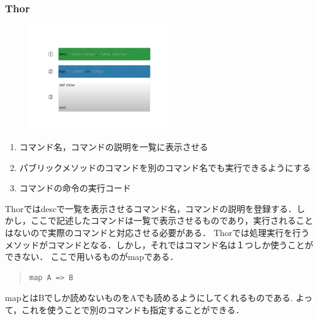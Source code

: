 \subsubsection{Thor}
\begin{figure}[htbp]\begin{center}
\includegraphics[width=6cm,bb=0 0 442 500]{../figs/./hikiutils_yamane_09_copy.004.jpg}
\caption{}
\label{default}\end{center}\end{figure}\begin{enumerate}
\item コマンド名，コマンドの説明を一覧に表示させる
\item パブリックメソッドのコマンドを別のコマンド名でも実行できるようにする
\item コマンドの命令の実行コード
\end{enumerate}
Thorではdescで一覧を表示させるコマンド名，コマンドの説明を登録する．しかし，ここで記述したコマンドは一覧で表示させるものであり，実行されることはないので実際のコマンドと対応させる必要がある．
Thorでは処理実行を行うメソッドがコマンドとなる．しかし，それではコマンド名は１つしか使うことができない．
ここで用いるものがmapである．
\begin{quote}\begin{verbatim}
map A => B
\end{verbatim}\end{quote}
mapとはBでしか読めないものをAでも読めるようにしてくれるものである.
よって，これを使うことで別のコマンドも指定することができる．

